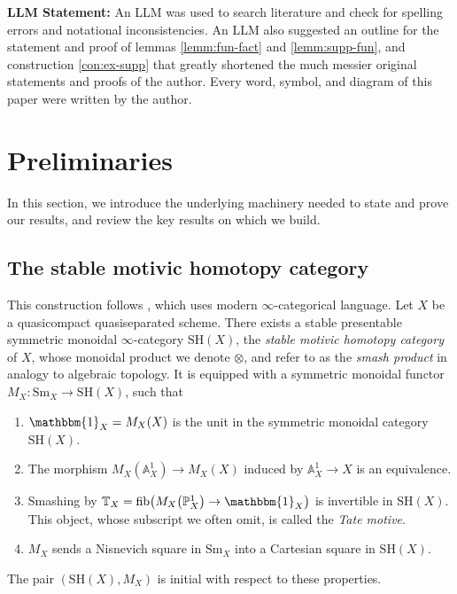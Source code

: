 \documentclass[11pt, twoside]{article}
\numberwithin{equation}{section}
\theoremstyle{definition}
\newcommand{\bb}[1]{\mathbb{#1}}
\newcommand{\sh}{\mathrm{SH}}
\newcommand{\sm}{\mathrm{Sm}}
\begin{document}
\vspace{1em}
\noindent
\textbf{LLM Statement:} An LLM was used to search literature and check for spelling errors and notational inconsistencies. An LLM also suggested an outline for the statement and proof of lemmas \ref{lemm:fun-fact} and \ref{lemm:supp-fun}, and construction \ref{con:ex-supp} that greatly shortened the much messier original statements and proofs of the author. Every word, symbol, and diagram of this paper were written by the author.

\section{Preliminaries}\label{prelim}
In this section, we introduce the underlying machinery needed to state and prove our results, and review the key results on which we build.

\subsection{The stable motivic homotopy category}
This construction follows \cite{Rob}, which uses modern \(\infty\)-categorical language. Let \(X\) be a quasicompact quasiseparated scheme. There exists a stable presentable symmetric monoidal \(\infty\)-category \(\sh(X)\), the \emph{stable motivic homotopy category} of \(X\), whose monoidal product we denote \(\otimes\), and refer to as the \emph{smash product} in analogy to algebraic topology. It is equipped with a symmetric monoidal functor \(M_X : \sm_X \to \sh(X)\), such that 
\begin{enumerate}
\item \(\mathbbm{1}_X = M_X(X)\) is the unit in the symmetric monoidal category \(\sh(X)\).

\item The morphism \(M_X(\bb{A}_X^1) \to M_X(X)\) induced by \(\bb{A}_X^1 \to X\) is an equivalence.

\item Smashing by \(\bb{T}_X = \mathrm{fib} \! \left(M_X\big(\bb{P}_X^1\big) \to \mathbbm{1}_X\right)\) is invertible in \(\sh(X)\). This object, whose subscript we often omit, is called the \emph{Tate motive}.

\item \(M_X\) sends a Nisnevich square in \(\sm_X\) into a Cartesian square in \(\sh(X)\).
\end{enumerate}
The pair \((\sh(X), M_X)\) is initial with respect to these properties.
\end{document}
